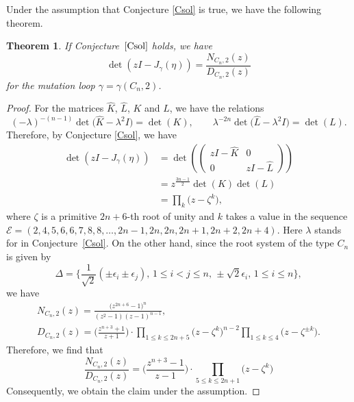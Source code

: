 \documentclass[10pt,a4paper]{amsart}
\numberwithin{equation}{section}
\newtheorem{Theorem}{Theorem}[section]
\newcommand{\ep}{\epsilon}
\begin{document}
Under the assumption that Conjecture \ref{Csol} is true, we have the following theorem.
	\begin{Theorem}%
	If Conjecture~$\ref{Csol}$ holds, we have
		\[\det (zI-J_\gamma(\eta))=\frac{N_{C_n,2}(z)}{D_{C_n,2}(z)}\]
	for the mutation loop $\gamma=\gamma(C_n,2)$.
	\end{Theorem}
	\begin{proof}
	For the matrices $\hat{K}$, $\hat{L}$, $K$ and $L$, we have the relations
		\[(-\lambda)^{-(n-1)}\det \bigl(\hat{K}-\lambda^2I\bigr)=\det (K),\qquad\lambda^{-2n}\det \bigl(\hat{L}-\lambda^2I\bigr)=\det (L).\]
	Therefore, by Conjecture \ref{Csol}, we have
		\begin{align*}
		\det (zI-J_\gamma(\eta))&=\det \left(\begin{pmatrix}
			zI-\hat{K}&0\\
			0&zI-\hat{L}\end{pmatrix}\right)\\
		&=z^\frac{3n-1}{2}\det (K)\det (L)\\
		&=\prod_k\bigl(z-\zeta^k\bigr),
		\end{align*}
	where $\zeta$ is a primitive $2n+6$-th root of unity and $k$ takes a value in the sequence $\mathcal{E}=(2,4,5,6,6,7,8,8,\dots,2n-1,2n,2n,2n+1,2n+2,2n+4)$.
	Here $\lambda$ stands for  in Conjecture~\ref{Csol}.
	On the other hand, since the root system of the type $C_n$ is given by
		\[\Delta=\biggl\{\frac{1}{\sqrt{2}}(\pm\ep_i\pm\ep_j),\, 1\leq i<j\leq n,\, \pm\sqrt{2}\ep_i,\, 1\leq i\leq n\biggr\},\]
	we have
		\begin{gather*}
N_{C_n,2}(z)=\frac{\bigl(z^{2n+6}-1\bigr)^n}{(z^2-1)(z-1)^{n-1}},\\
 D_{C_n,2}(z)=\biggl(\frac{z^{n+3}+1}{z+1}\biggr)\cdot\prod_{1\leq k\leq 2n+5}\bigl(z-\zeta^k\bigr)^{n-2}\prod_{1\leq k\leq4}\bigl(z-\zeta^{\pm k}\bigr).
 \end{gather*}
	Therefore, we find that
		\[\frac{N_{C_n,2}(z)}{D_{C_n,2}(z)}=\biggl(\frac{z^{n+3}-1}{z-1}\biggr)\cdot\prod_{5\leq k\leq 2n+1}\bigl(z-\zeta^k\bigr)\]
	Consequently, we obtain the claim under the assumption.
	\end{proof}
\end{document}
